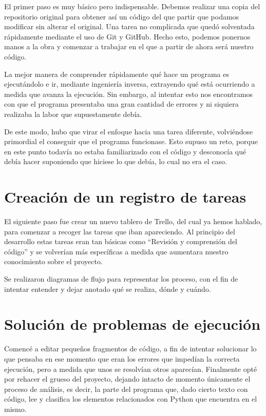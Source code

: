 \documentclass[a4paper, 12pt]{book}
\begin{document}
El primer paso es muy básico pero indispensable. Debemos realizar una copia del repositorio original para obtener así un código del que partir que podamos modificar sin alterar el original. Una tarea no complicada que quedó solventada rápidamente mediante el uso de Git y GitHub. Hecho esto, podemos ponernos manos a la obra y comenzar a trabajar en el que a partir de ahora será nuestro código.

La mejor manera de comprender rápidamente qué hace un programa es ejecutándolo e ir, mediante ingeniería inversa, extrayendo qué está ocurriendo a medida que avanza la ejecución. Sin embargo, al intentar esto nos encontramos con que el programa presentaba una gran cantidad de errores y ni siquiera realizaba la labor que supuestamente debía. 

De este modo, hubo que virar el enfoque hacia una tarea diferente, volviéndose primordial el conseguir que el programa funcionase. Esto supuso un reto, porque en este punto todavía no estaba familiarizado con el código y desconocía qué debía hacer suponiendo que hiciese lo que debía, lo cual no era el caso.

\section{Creación de un registro de tareas}

El siguiente paso fue crear un nuevo tablero de Trello, del cual ya hemos hablado, para comenzar a recoger las tareas que iban apareciendo. Al principio del desarrollo estas tareas eran tan básicas como ``Revisión y comprensión del código'' y se volverían más específicas a medida que aumentara nuestro conocimiento sobre el proyecto.

Se realizaron diagramas de flujo para representar los proceso, con el fin de intentar entender y dejar anotado qué se realiza, dónde y cuándo.

\section{Solución de problemas de ejecución}

Comencé a editar pequeños fragmentos de código, a fin de intentar solucionar lo que pensaba en ese momento que eran los errores que impedían la correcta ejecución, pero a medida que unos se resolvían otros aparecían. Finalmente opté por rehacer el grueso del proyecto, dejando intacto de momento únicamente el proceso de análisis, es decir, la parte del programa que, dado cierto texto con código, lee y clasifica los elementos relacionados con Python que encuentra en el mismo.
\end{document}
